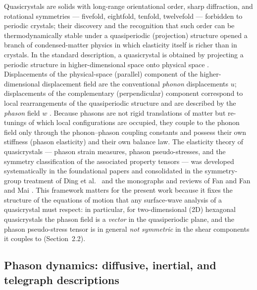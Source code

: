 \documentclass[11pt]{article}
\begin{document}
Quasicrystals are solids with long-range orientational order, sharp diffraction, and rotational symmetries --- fivefold, eightfold, tenfold, twelvefold --- forbidden to periodic crystals; their discovery \cite{shechtman1984} and the recognition that such order can be thermodynamically stable under a quasiperiodic (projection) structure \cite{levine1984} opened a branch of condensed-matter physics in which elasticity itself is richer than in crystals. In the standard description, a quasicrystal is obtained by projecting a periodic structure in higher-dimensional space onto physical space \cite{janot1994,steurer2009}. Displacements of the physical-space (parallel) component of the higher-dimensional displacement field are the conventional \emph{phonon} displacements $u$; displacements of the complementary (perpendicular) component correspond to local rearrangements of the quasiperiodic structure and are described by the \emph{phason} field $w$ \cite{bak1985,levin1985,socolar1986}. Because phasons are not rigid translations of matter but re-tunings of which local configurations are occupied, they couple to the phonon field only through the phonon--phason coupling constants and possess their own stiffness (phason elasticity) and their own balance law. The elasticity theory of quasicrystals --- phason strain measures, phason pseudo-stresses, and the symmetry classification of the associated property tensors --- was developed systematically in the foundational papers \cite{bak1985,socolar1986,levin1985,lubensky1985} and consolidated in the symmetry-group treatment of Ding et al.\ \cite{ding2000} and the monographs and reviews of Fan \cite{fan2011} and Fan and Mai \cite{fan2004amr}. This framework matters for the present work because it fixes the structure of the equations of motion that any surface-wave analysis of a quasicrystal must respect: in particular, for two-dimensional (2D) hexagonal quasicrystals the phason field is a \emph{vector} in the quasiperiodic plane, and the phason pseudo-stress tensor is in general \emph{not symmetric} in the shear components it couples to (Section~2.2).

\subsection{Phason dynamics: diffusive, inertial, and telegraph descriptions}
\end{document}
